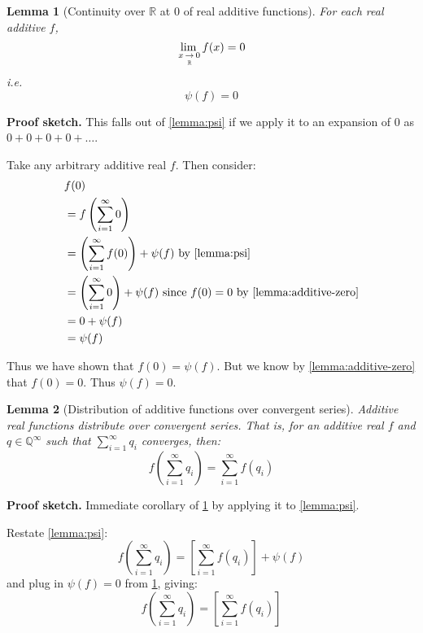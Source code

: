 \documentclass{article}
\theoremstyle{mytheoremstyle}
\newtheorem{lemma}{Lemma}
\renewenvironment{proof}[1][\proofname]{\noindent{\bfseries #1. }}{\begin{flushright}\smiley\end{flushright}}
\newcommand{\sketch}{\noindent\textbf{Proof sketch.} }
\newcommand{\R}{\mathbb R}
\begin{document}

\begin{lemma}[Continuity over $\mathbb R$ at 0 of real additive functions]
\label{lemma:real-continuous-0}
For each real additive $f$,
$$ \limx{\R}{x}{0} f(x) = 0 $$
i.e.
$$ \psi(f) = 0 $$
\end{lemma}

\sketch This falls out of \cref{lemma:psi} if we apply it to an expansion of $0$ as $0 + 0 + 0 + 0 + \dots$.

\begin{proof}
Take any arbitrary additive real $f$. Then consider:
\begin{align*}
    & f(0) \\
    &= f\left(\sum_{i=1}^\infty 0\right) \\
    &= \left( \sum_{i=1}^\infty f(0) \right) + \psi(f) \text{ by \cref{lemma:psi}} \\
    &= \left( \sum_{i=1}^\infty 0 \right) + \psi(f) \text{ since $f(0) = 0$ by \cref{lemma:additive-zero}}\\
    &= 0 + \psi(f) \\
    &= \psi(f)
\end{align*}

Thus we have shown that $f(0) = \psi(f)$. But we know by \cref{lemma:additive-zero} that $f(0) = 0$. Thus $\psi(f) = 0$.
\end{proof}


\begin{lemma}[Distribution of additive functions over convergent series]
\label{lemma:additive-distribution}
Additive real functions distribute over convergent series. That is, for an additive real $f$ and $q \in \mathbb Q ^\infty$ such that $\sum_{i=1}^\infty q_i$ converges, then:
$$ f\left( \sum_{i = 1}^\infty q_i \right) = \sum_{i=1}^\infty f(q_i) $$
\end{lemma}

\sketch Immediate corollary of \cref{lemma:real-continuous-0} by applying it to \cref{lemma:psi}.

\begin{proof}


Restate \cref{lemma:psi}:
$$ f\left( \sum_{i = 1}^\infty q_i \right) = \left[ \sum_{i=1}^\infty f(q_i) \right] + \psi(f) $$
and plug in $\psi(f) = 0$ from \cref{lemma:real-continuous-0}, giving:
$$ f\left( \sum_{i = 1}^\infty q_i \right) = \left[ \sum_{i=1}^\infty f(q_i) \right] $$

\end{proof}
\end{document}
